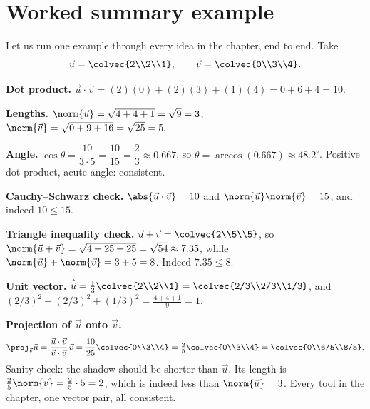 \section{Worked summary example}

Let us run one example through every idea in the chapter, end to end. Take
\[
  \vec u = \colvec{2\\2\\1}, \qquad \vec v = \colvec{0\\3\\4}.
\]

\textbf{Dot product.}
$\vec u\cdot\vec v = (2)(0)+(2)(3)+(1)(4) = 0+6+4 = 10.$

\textbf{Lengths.}
$\norm{\vec u} = \sqrt{4+4+1} = \sqrt9 = 3$, \quad
$\norm{\vec v} = \sqrt{0+9+16} = \sqrt{25} = 5.$

\textbf{Angle.}
$\cos\theta = \dfrac{10}{3\cdot5} = \dfrac{10}{15} = \dfrac23 \approx 0.667$,
so $\theta = \arccos(0.667)\approx 48.2^\circ$. Positive dot product, acute angle:
consistent.

\textbf{Cauchy--Schwarz check.}
$\abs{\vec u\cdot\vec v} = 10$ and $\norm{\vec u}\norm{\vec v} = 15$, and indeed
$10 \le 15$. \checkmark

\textbf{Triangle inequality check.}
$\vec u+\vec v = \colvec{2\\5\\5}$, so $\norm{\vec u+\vec v} = \sqrt{4+25+25}
= \sqrt{54}\approx 7.35$, while $\norm{\vec u}+\norm{\vec v} = 3+5 = 8$. Indeed
$7.35 \le 8$. \checkmark

\textbf{Unit vector.}
$\hat{\vec u} = \tfrac13\colvec{2\\2\\1} = \colvec{2/3\\2/3\\1/3}$, and
$(2/3)^2+(2/3)^2+(1/3)^2 = \tfrac{4+4+1}{9} = 1.$ \checkmark

\textbf{Projection of $\vec u$ onto $\vec v$.}
\[
  \proj_{\vec v}\vec u
   = \frac{\vec u\cdot\vec v}{\vec v\cdot\vec v}\,\vec v
   = \frac{10}{25}\colvec{0\\3\\4}
   = \tfrac25\colvec{0\\3\\4}
   = \colvec{0\\6/5\\8/5}.
\]
Sanity check: the shadow should be shorter than $\vec u$. Its length is
$\tfrac25\norm{\vec v} = \tfrac25\cdot 5 = 2$, which is indeed less than
$\norm{\vec u}=3$. \checkmark Every tool in the chapter, one vector pair, all
consistent.

